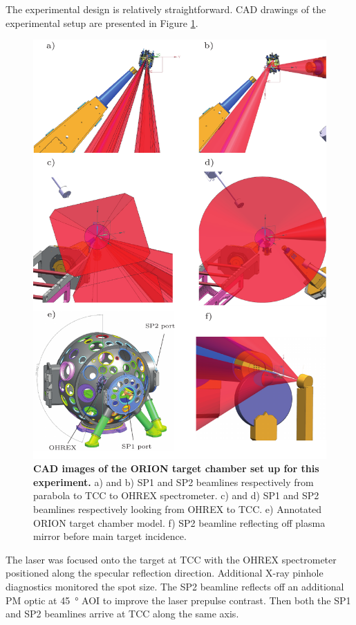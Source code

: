 The experimental design is relatively straightforward. CAD drawings of the experimental setup are presented in Figure \ref{fig:orioncad}.
\begin{figure}
	\centering
	\includegraphics[width=1\linewidth]{figures/orion/orion_cad}
	\caption[ORION HHG experiment target chamber set up.]{\textbf{CAD images of the ORION target chamber set up for this experiment.} a) and b) SP1 and SP2 beamlines respectively from parabola to TCC to OHREX spectrometer. c) and d) SP1 and SP2 beamlines respectively looking from OHREX to TCC. e) Annotated ORION target chamber model. f) SP2 beamline reflecting off plasma mirror before main target incidence.}
	\label{fig:orioncad}
\end{figure}
The laser was focused onto the target at \ac{TCC} with the \ac{OHREX} spectrometer positioned along the specular reflection direction. Additional X-ray pinhole diagnostics monitored the spot size. The SP2 beamline reflects off an additional \ac{PM} optic at \qty{45}{\degree} \ac{AOI} to improve the laser prepulse contrast. Then both the SP1 and SP2 beamlines arrive at \ac{TCC} along the same axis.

